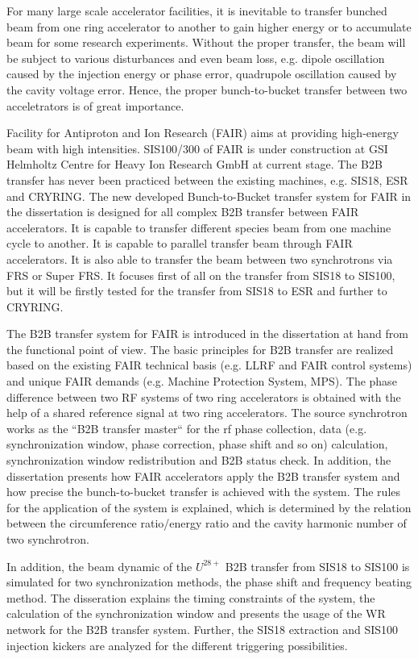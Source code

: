 For many large scale accelerator facilities, it is inevitable to transfer bunched beam from one ring accelerator to another to gain higher energy or to accumulate beam for some research experiments. Without the proper transfer, the beam will be subject to various disturbances and even beam loss, e.g. dipole oscillation caused by the injection energy or phase error, quadrupole oscillation caused by the cavity voltage error. Hence, the proper bunch-to-bucket transfer between two acceletrators is of great importance. 

Facility for Antiproton and Ion Research (FAIR) aims at providing high-energy beam with high intensities. SIS100/300 of FAIR is under construction at GSI Helmholtz Centre for Heavy Ion Research GmbH at current stage. The B2B transfer has never been practiced between the existing machines, e.g. SIS18, ESR and CRYRING. The new developed Bunch-to-Bucket transfer system for FAIR in the dissertation is designed for all complex B2B transfer between FAIR accelerators. It is capable to transfer different species beam from one machine cycle to another. It is capable to parallel transfer beam through FAIR accelerators. It is also able to transfer the beam between two synchrotrons via FRS or Super FRS. It focuses first of all on the transfer from SIS18 to SIS100, but it will be firstly tested for the transfer from SIS18 to ESR and further to CRYRING.

The B2B transfer system for FAIR is introduced in the dissertation at hand from the functional point of view. The basic principles for B2B transfer are realized based on the existing FAIR technical basis (e.g. LLRF and FAIR control systems) and unique FAIR demands (e.g. Machine Protection System, MPS). The phase difference between two RF systems of two ring accelerators is obtained with the help of a shared reference signal at two ring accelerators. The source synchrotron works as the ``B2B transfer master`` for the rf phase collection, data (e.g. synchronization window, phase correction, phase shift and so on) calculation, synchronization window redistribution and B2B status check. In addition, the dissertation presents how FAIR accelerators apply the B2B transfer system and how precise the bunch-to-bucket transfer is achieved with the system. The rules for the application of the system is explained, which is determined by the relation between the circumference ratio/energy ratio and the cavity harmonic number of two synchrotron.

In addition, the beam dynamic of the $U^{28+}$ B2B transfer from SIS18 to SIS100 is simulated for two synchronization methods, the phase shift and frequency beating method. The disseration explains the timing constraints of the system, the calculation of the synchronization window and presents the usage of the WR network for the B2B transfer system. Further, the SIS18 extraction and SIS100 injection kickers are analyzed for the different triggering possibilities. 

